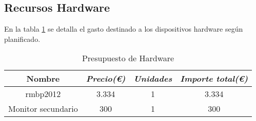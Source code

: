 \subsection{Recursos Hardware}

En la tabla \ref{tab:budget-hardware} se detalla el gasto destinado a los dispositivos hardware según planificado.

\begin{table}[htp]
	\centering
	\caption{Presupuesto de Hardware}\label{tab:budget-hardware}
	\begin{tabular}{cccc}
		\toprule
    	\textbf{Nombre} & \emph{Precio(\euro)} & \emph{Unidades} & \emph{Importe total(\euro)}\\
    	\midrule
    	\acrshort{rmbp}2012			& 	3.334			&	1 			&	3.334					\\
    	Monitor secundario	&	300				&	1			&	300						\\
    	\bottomrule
    \end{tabular}
\end{table}